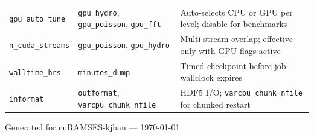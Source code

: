 \begin{longtable}{@{}p{4cm}p{4.5cm}p{6.5cm}@{}}
\addlinespace
\texttt{gpu\_auto\_tune}
  & \texttt{gpu\_hydro}, \texttt{gpu\_poisson}, \texttt{gpu\_fft}
  & Auto-selects CPU or GPU per level; disable for benchmarks \\
\addlinespace
\texttt{n\_cuda\_streams}
  & \texttt{gpu\_poisson}, \texttt{gpu\_hydro}
  & Multi-stream overlap; effective only with GPU flags active \\
\addlinespace
\texttt{walltime\_hrs}
  & \texttt{minutes\_dump}
  & Timed checkpoint before job wallclock expires \\
\addlinespace
\texttt{informat}
  & \texttt{outformat}, \texttt{varcpu\_chunk\_nfile}
  & HDF5 I/O; \texttt{varcpu\_chunk\_nfile} for chunked restart \\
\end{longtable}


\vfill
\begin{center}
\small\sffamily\textcolor{apitype}{%
Generated for cuRAMSES-kjhan --- \today}
\end{center}


